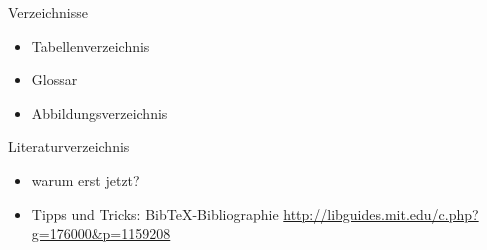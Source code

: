 \begin{frame}{Verzeichnisse}

\begin{itemize}
\itemsep1pt\parskip0pt
\item
  Tabellenverzeichnis
\item
  Glossar
\item
  Abbildungsverzeichnis
\end{itemize}

\end{frame}

\begin{frame}{Literaturverzeichnis}

\begin{itemize}
\itemsep1pt\parskip0pt
\item
  warum erst jetzt?
\item
  Tipps und Tricks: BibTeX-Bibliographie
  \url{http://libguides.mit.edu/c.php?g=176000\&p=1159208}
\end{itemize}

\end{frame}
